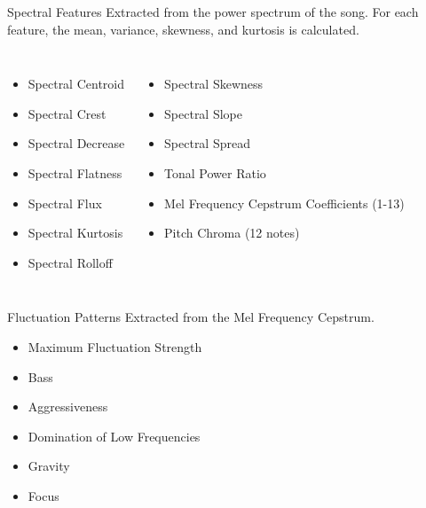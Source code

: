 \documentclass[xcolor=dvipsnames,t]{beamer} %
\begin{document}
\begin{frame}{Spectral Features}
Extracted from the power spectrum of the song.  For each feature, the mean, variance, skewness, and kurtosis is calculated.
\begin{columns}[t]
\begin{itemize}
\item Spectral Centroid
\item Spectral Crest
\item Spectral Decrease
\item Spectral Flatness
\item Spectral Flux
\item Spectral Kurtosis
\item Spectral Rolloff
\end{itemize}
\begin{itemize}
\item Spectral Skewness
\item Spectral Slope
\item Spectral Spread
\item Tonal Power Ratio
\item Mel Frequency Cepstrum Coefficients (1-13)
\item Pitch Chroma (12 notes)
\end{itemize}
\end{columns}

\end{frame}
\begin{frame}{Fluctuation Patterns}
Extracted from the Mel Frequency Cepstrum.
\begin{itemize}
\item Maximum Fluctuation Strength
\item Bass
\item Aggressiveness
\item Domination of Low Frequencies
\item Gravity
\item Focus
\end{itemize}

\end{frame}
\end{document}
